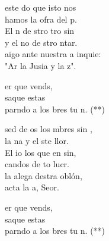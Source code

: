 \begin{cancion}%
	 este do que isto nos  \\
	hamos la ofra del p.  \\
	El n de stro tro sin  \\
	y el no de stro ntar.\\
	aigo ante nuestra a inquie:\\
	"Ar la Jusia y la z". \jump\\
	\begin{chorus}%
		er que vends,\\
		saque estas\\
		parndo a los bres tu n. (**)\jump\\
	\end{chorus}%
	 sed de os los mbres sin ,\\
	la na y el ste llor.  \\
	El io los que en sin,\\
	candos de to lucr.\\
	 la alega destra oblón,\\
	acta la a, Seor. \jump\\
	\begin{chorus}%
		er que vend\chord{La}{}{rá}s,\\
		saque esta\chord{si}{m}{rá}s\\
		parndo a los bres tu n. (**)\jump\\
	\end{chorus}%
\end{cancion}%
